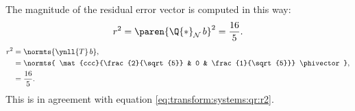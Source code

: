 The magnitude of the residual error vector is computed in this way:
\begin{equation}
  r^{2} = \paren{ \Q{*}_{\mathcal{N}}\,b}^{2} = \frac{16}{5}.
\end{equation}
\begin{equation}
  \begin{split}
     r^{2} &= \normts{ \ynll{T}\,b}, \\
     &= \normts{ \mat{ccc}{\frac{2}{\sqrt{5}} & 0 & \frac{1}{\sqrt{5}}} \phivector}, \\
     &= \frac{16}{5}.
  \end{split}
\end{equation}
This is in agreement with equation \eqref{eq:transform:systems:qr:r2}.

\endinput